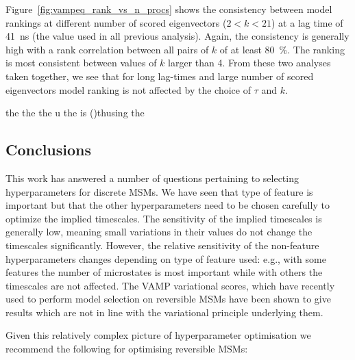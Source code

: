\documentclass[journal=jacsat,manuscript=article]{achemso}
\begin{document}
Figure~\ref{fig:vampeq_rank_vs_n_procs} shows the consistency between model rankings at different number of scored eigenvectors ($2 < k < 21$) at a lag time of \SI{41}{\nano\second} (the value used in all previous analysis). Again, the consistency is generally high with a rank correlation between all pairs of $k$ of at least \SI{80}{\percent}. The ranking is most consistent between values of $k$ larger than \num{4}.  From these two analyses taken together, we see that for long lag-times and large number of scored eigenvectors model ranking is not affected by the choice of $\tau$ and $k$.

  the the the         u    the is    ()thusing the 
\subsection{Conclusions}
This work has answered a number of questions pertaining to selecting hyperparameters for discrete MSMs.  We have seen that type of feature is important but that the other hyperparameters need to be chosen carefully to optimize the implied timescales.  The sensitivity of the implied timescales is generally low, meaning small variations in their values do not change the timescales significantly.  However, the relative sensitivity of the non-feature hyperparameters changes depending on type of feature used: e.g., with some features the number of microstates is most important while with others the timescales are not affected.  The VAMP variational scores, which have recently used to perform model selection on reversible MSMs have been shown to give results which are not in line with the variational principle underlying them. 

Given this relatively complex picture of hyperparameter optimisation we recommend the following for optimising reversible MSMs: 
\end{document}
